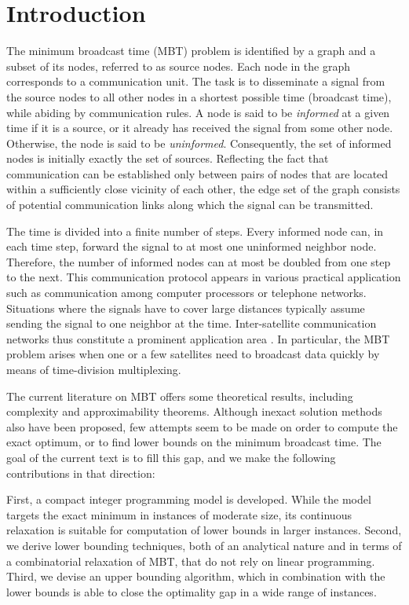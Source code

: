 \section{Introduction}
\label{intro}
The minimum broadcast time (MBT) problem is identified by a graph and a subset of its nodes,
referred to as source nodes.
Each node in the graph corresponds to a communication unit.
The task is to disseminate a signal from the source nodes to all other nodes in a shortest possible time (broadcast time), while abiding by communication rules.
A node is said to be \emph{informed} at a given time if it is a source, or it already has received the signal from some other node.
Otherwise, the node is said to be \emph{uninformed}.
Consequently, the set of informed nodes is initially exactly the set of sources.
Reflecting the fact that communication can be established only between pairs of nodes that are located within a sufficiently close vicinity of each other,
the edge set of the graph consists of potential communication links along which the signal can be transmitted.

The time is divided into a finite number of steps.
Every informed node can, in each time step, forward the signal to at most one uninformed neighbor node.
Therefore, the number of informed nodes can at most be doubled from one step to the next.
This communication protocol appears in various practical application such as communication among computer processors or telephone networks.
Situations where the signals have to cover large distances typically assume sending the signal to one neighbor at the time.
Inter-satellite communication networks thus constitute a prominent application area \cite{chu17}.
In particular, the MBT problem arises when one or a few satellites need to broadcast data quickly by means of time-division multiplexing.

The current literature on MBT offers some theoretical results, including complexity and approximability theorems.
Although inexact solution methods also have been proposed, few attempts seem to be made on order to compute the exact optimum,
or to find lower bounds on the minimum broadcast time.
The goal of the current text is to fill this gap, and we make the following contributions in that direction:

First, a compact integer programming model is developed.
While the model targets the exact minimum in instances of moderate size, its continuous relaxation is suitable for computation of lower bounds in larger instances.
Second, we derive lower bounding techniques, both of an analytical nature and in terms of a combinatorial relaxation of MBT,
that do not rely on linear programming.
Third, we devise an upper bounding algorithm, which in combination with the lower bounds is able to close the optimality gap in a wide range of instances.

